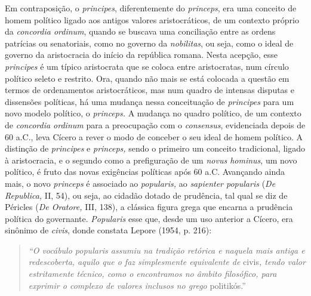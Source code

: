 Em contraposição, o \emph{principes}, diferentemente do \emph{princeps},
era uma conceito de homem político ligado aos antigos valores
aristocráticos, de um contexto próprio da \emph{concordia ordinum},
quando se buscava uma conciliação entre as ordens patrícias ou
senatoriais, como no governo da \emph{nobilitas}, ou seja, como o ideal
de governo da aristocracia do início da república romana. Nesta acepção,
esse \emph{principes} é um típico aristocrata que se coloca entre
aristocratas, num círculo político seleto e restrito. Ora, quando não
mais se está colocada a questão em termos de ordenamentos
aristocráticos, mas num quadro de intensas disputas e dissensões
políticas, há uma mudança nessa conceituação de \emph{principes} para um
novo modelo político, o \emph{princeps.} A mudança no quadro político,
de um contexto de \emph{concordia ordinum} para a preocupação com o
\emph{consensus}, evidenciada depois de 60 a.C., leva Cícero a rever o
modo de conceber o seu ideal de homem político. A distinção de
\emph{principes} e \emph{princeps,} sendo o primeiro um conceito
tradicional, ligado à aristocracia, e o segundo como a prefiguração de
um \emph{novus hominus}, um novo político, é fruto das novas exigências
políticas após 60 a.C. Avançando ainda mais, o novo \emph{princeps} é
associado ao \emph{popularis,} ao \emph{sapienter popularis} (\emph{De
Republica,} II, 54), ou seja, ao cidadão dotado de prudência, tal qual
se diz de Péricles (\emph{De Oratore,} III, 138), a clássica figura
grega que encarna a prudência política do governante. \emph{Popularis}
esse que, desde um uso anterior a Cícero, era sinônimo de \emph{civis},
donde constata Lepore (1954, p. 216):

\begin{quote}
\emph{``O vocábulo popularis assumiu na tradição retórica e naquela mais
antiga e redescoberta, aquilo que o faz simplesmente equivalente de}
civis\emph{, tendo valor estritamente técnico, como o encontramos no
âmbito filosófico, para exprimir o complexo de valores inclusos no
grego} politikós.''
\end{quote}

